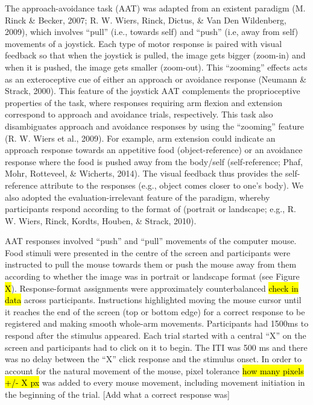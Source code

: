 \documentclass[man,floatsintext]{apa6}
\begin{document}
The approach-avoidance task (AAT) was adapted from an existent paradigm
(M. Rinck \& Becker, 2007; R. W. Wiers, Rinck, Dictus, \& Van Den
Wildenberg, 2009), which involves \enquote{pull} (i.e., towards self)
and \enquote{push} (i.e, away from self) movements of a joystick. Each
type of motor response is paired with visual feedback so that when the
joystick is pulled, the image gets bigger (zoom-in) and when it is
pushed, the image gets smaller (zoom-out). This \enquote{zooming}
effects acts as an exteroceptive cue of either an approach or avoidance
response (Neumann \& Strack, 2000). This feature of the joystick AAT
complements the proprioceptive properties of the task, where responses
requiring arm flexion and extension correspond to approach and avoidance
trials, respectively. This task also disambiguates approach and
avoidance responses by using the \enquote{zooming} feature (R. W. Wiers
et al., 2009). For example, arm extension could indicate an approach
response towards an appetitive food (object-reference) or an avoidance
response where the food is pushed away from the body/self
(self-reference; Phaf, Mohr, Rotteveel, \& Wicherts, 2014). The visual
feedback thus provides the self-reference attribute to the responses
(e.g., object comes closer to one's body). We also adopted the
evaluation-irrelevant feature of the paradigm, whereby participants
respond according to the format of (portrait or landscape; e.g., R. W.
Wiers, Rinck, Kordts, Houben, \& Strack, 2010).

\par

AAT responses involved \enquote{push} and \enquote{pull} movements of
the computer mouse. Food stimuli were presented in the centre of the
screen and participants were instructed to pull the mouse towards them
or push the mouse away from them according to whether the image was in
portrait or landscape format (see Figure \hl{X}). Response-format
assignments were approximately counterbalanced \hl{check in data} across
participants. Instructions highlighted moving the mouse cursor until it
reaches the end of the screen (top or bottom edge) for a correct
response to be registered and making smooth whole-arm movements.
Participants had 1500ms to respond after the stimulus appeared. Each
trial started with a central \enquote{X} on the screen and participants
had to click on it to begin. The ITI was 500 ms and there was no delay
between the \enquote{X} click response and the stimulus onset. In order
to account for the natural movement of the mouse, pixel tolerance
\hl{how many pixels +/- X px
} was added to every mouse movement, including movement initiation in
the beginning of the trial. {[}Add what a correct response was{]}
\end{document}
